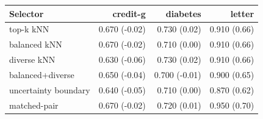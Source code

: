 \begin{tabular}{lrrr}
\toprule
Selector & credit-g & diabetes & letter \\
\midrule
top-k kNN & 0.670 (-0.02) & 0.730 (0.02) & 0.910 (0.66) \\
balanced kNN & 0.670 (-0.02) & 0.710 (0.00) & 0.910 (0.66) \\
diverse kNN & 0.630 (-0.06) & 0.730 (0.02) & 0.910 (0.66) \\
balanced+diverse & 0.650 (-0.04) & 0.700 (-0.01) & 0.900 (0.65) \\
uncertainty boundary & 0.640 (-0.05) & 0.710 (0.00) & 0.870 (0.62) \\
matched-pair & 0.670 (-0.02) & 0.720 (0.01) & 0.950 (0.70) \\
\bottomrule
\end{tabular}

